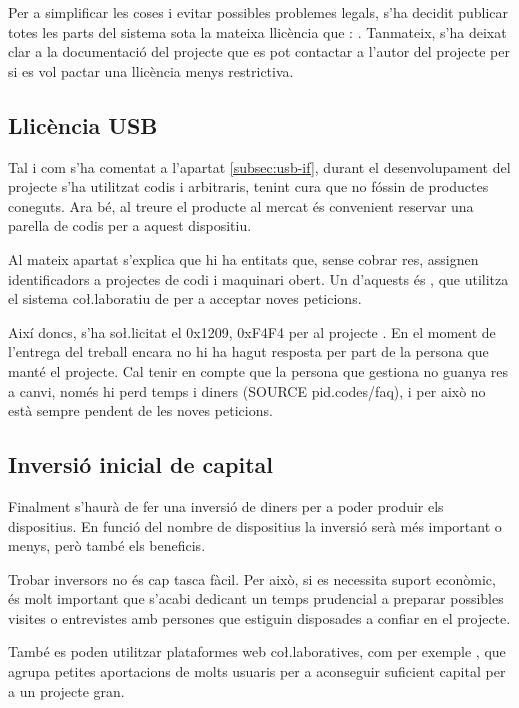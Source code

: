 Per a simplificar les coses i evitar possibles problemes legals, s'ha decidit
publicar totes les parts del sistema sota la mateixa llicència que :
. Tanmateix, s'ha deixat clar a la documentació del projecte que
es pot contactar a l'autor del projecte per si es vol pactar una llicència menys
restrictiva.

\subsection{Llicència USB}

Tal i com s'ha comentat a l'apartat \ref{subsec:usb-if}, durant el desenvolupament
del projecte s'ha utilitzat codis  i  arbitraris, tenint
cura que no fóssin de productes coneguts. Ara bé, al treure el producte al
mercat és convenient reservar una parella de codis per a aquest dispositiu.

Al mateix apartat s'explica que hi ha entitats que, sense cobrar res, assignen
identificadors a projectes de codi i maquinari obert. Un d'aquests és
, que utilitza el sistema co\l.laboratiu de  per a
acceptar noves peticions.

Així doncs, s'ha so\l.licitat el  0x1209, 0xF4F4 per al projecte
. En el moment de l'entrega del treball encara no hi ha hagut
resposta per part de la persona que manté el projecte. Cal tenir en compte que
la persona que gestiona  no guanya res a canvi, només hi perd
temps i diners (SOURCE pid.codes/faq), i per això no està sempre pendent de
les noves peticions.

\subsection{Inversió inicial de capital}

Finalment s'haurà de fer una inversió de diners per a poder produir els
dispositius. En funció del nombre de dispositius la inversió serà més important
o menys, però també els beneficis.

Trobar inversors no és cap tasca fàcil. Per això, si es necessita suport
econòmic, és molt important que s'acabi dedicant un temps prudencial a preparar
possibles visites o entrevistes amb persones que estiguin disposades a confiar
en el projecte.

També es poden utilitzar plataformes web co\l.laboratives, com per exemple
, que agrupa petites aportacions de molts usuaris per a
aconseguir suficient capital per a un projecte gran.
